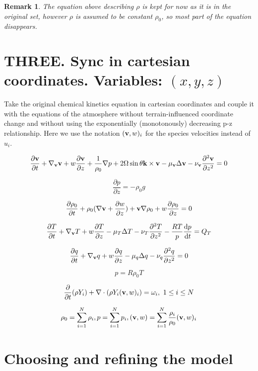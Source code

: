\documentclass{article}
\newtheorem*{remark}{Remark}
\begin{document}
\begin{remark}
The equation above describing $\rho$ is kept for now as it is in the original set, however $\rho$ is assumed to be constant $\rho_0$, so most part of the equation disappears.
\end{remark}

\section{THREE. Sync in cartesian coordinates. Variables: $(x,y,z)$}

Take the original chemical kinetics equation in cartesian coordinates and couple it with the equations of the atmosphere without terrain-influenced coordinate change and without using the exponentially (monotonously) decreasing p-z relationship. Here we use the notation $(\bold{v}, w)_i$ for the species velocities instead of $u_i$.

\[ \frac{\partial \bold{v} }{\partial t} + \nabla_{\bold{v}}\bold{v} + w  \frac{\partial \bold{v} }{\partial z} + \frac{1}{\rho_0}\nabla p + 2 \Omega \sin \theta \bold{k} \times \bold{v}  -\mu_{\bold{v}}\Delta \bold{v}  -\nu_{\bold{v}} \frac{\partial ^ 2 \bold{v} }{\partial z^2} = 0  \]

\[ \frac{\partial p }{\partial z} = - \rho_0 g \]

\[ \frac{\partial \rho_0}{\partial t} + \rho_0 (\nabla \bold{v} + \frac{\partial w }{\partial z}) + \bold{v} \nabla \rho_0 + w \frac{\partial \rho_0}{\partial z} = 0 \]

\[ \frac{\partial T }{\partial t} + \nabla_{\bold{v}} T  + w  \frac{\partial T }{\partial z} - \mu_T \Delta T  -\nu_T \frac{\partial^2 T }{\partial z^2} -\frac{RT}{p} \frac{\mathrm{d}p}{\mathrm{d}t} = Q_T \]

\[ \frac{\partial q }{\partial t} + \nabla_{\bold{v}}q + w \frac{\partial q}{\partial z} - \mu_q \Delta q  - \nu_q \frac{\partial ^2 q }{\partial z^2} = 0 \]

\[ p = R \rho_0 T \]

\[ \frac{\partial}{\partial t} (\rho Y_i) + \nabla \cdot (\rho Y_i (\bold{v}, w)_i) = \omega_i, \text{  } 1 \leq i \leq N \]

\[ \rho_0 = \sum_{i =1}^{N} \rho_i, p = \sum_{i =1}^{N} p_i, (\bold{v}, w) = \sum_{i =1}^{N}\frac{\rho_i}{\rho_0} (\bold{v}, w)_i \]

\section{Choosing and refining the model}
\end{document}
